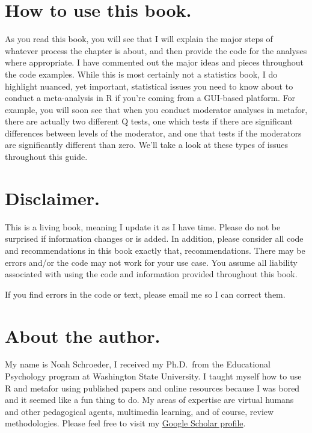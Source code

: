 \documentclass[
]{book}
\begin{document}
\hypertarget{how-to-use-this-book.}{%
\section*{How to use this book.}\label{how-to-use-this-book.}}

As you read this book, you will see that I will explain the major steps of whatever process the chapter is about, and then provide the code for the analyses where appropriate. I have commented out the major ideas and pieces throughout the code examples. While this is most certainly not a statistics book, I do highlight nuanced, yet important, statistical issues you need to know about to conduct a meta-analysis in R if you're coming from a GUI-based platform. For example, you will soon see that when you conduct moderator analyses in metafor, there are actually two different Q tests, one which tests if there are significant differences between levels of the moderator, and one that tests if the moderators are significantly different than zero. We'll take a look at these types of issues throughout this guide.

\hypertarget{disclaimer.}{%
\section*{Disclaimer.}\label{disclaimer.}}

This is a living book, meaning I update it as I have time. Please do not be surprised if information changes or is added. In addition, please consider all code and recommendations in this book exactly that, recommendations. There may be errors and/or the code may not work for your use case. You assume all liability associated with using the code and information provided throughout this book.

If you find errors in the code or text, please email me so I can correct them.

\hypertarget{about-the-author.}{%
\section*{About the author.}\label{about-the-author.}}

My name is Noah Schroeder, I received my Ph.D.~from the Educational Psychology program at Washington State University. I taught myself how to use R and metafor using published papers and online resources because I was bored and it seemed like a fun thing to do. My areas of expertise are virtual humans and other pedagogical agents, multimedia learning, and of course, review methodologies. Please feel free to visit my \href{https://scholar.google.com/citations?user=W-Ij6voAAAAJ\&hl=en\&oi=ao}{Google Scholar profile}.
\end{document}
